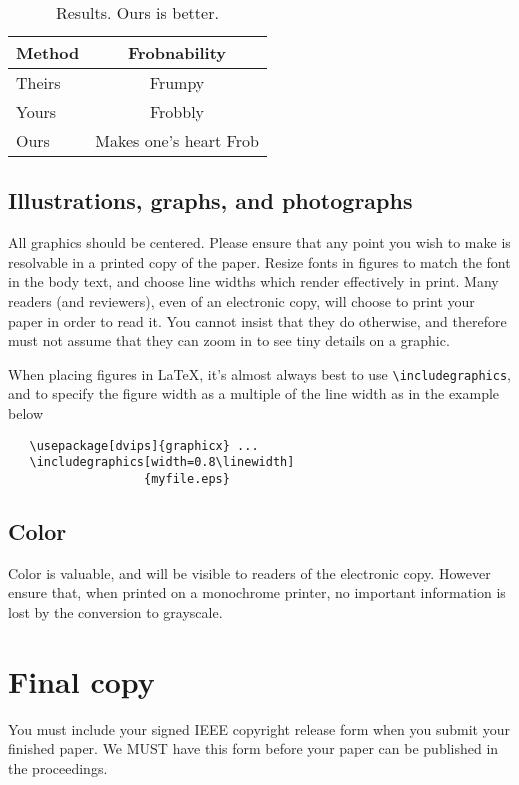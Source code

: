 \documentclass[10pt,twocolumn,letterpaper]{article}
\begin{document}
\begin{table}
\begin{center}
\begin{tabular}{|l|c|}
\hline
Method & Frobnability \\
\hline\hline
Theirs & Frumpy \\
Yours & Frobbly \\
Ours & Makes one's heart Frob\\
\hline
\end{tabular}
\end{center}
\caption{Results.   Ours is better.}
\end{table}

\subsection{Illustrations, graphs, and photographs}

All graphics should be centered.  Please ensure that any point you wish to
make is resolvable in a printed copy of the paper.  Resize fonts in figures
to match the font in the body text, and choose line widths which render
effectively in print.  Many readers (and reviewers), even of an electronic
copy, will choose to print your paper in order to read it.  You cannot
insist that they do otherwise, and therefore must not assume that they can
zoom in to see tiny details on a graphic.

When placing figures in \LaTeX, it's almost always best to use
\verb+\includegraphics+, and to specify the  figure width as a multiple of
the line width as in the example below
{\small\begin{verbatim}
   \usepackage[dvips]{graphicx} ...
   \includegraphics[width=0.8\linewidth]
                   {myfile.eps}
\end{verbatim}
}


\subsection{Color}

Color is valuable, and will be visible to readers of the electronic copy.
However ensure that, when printed on a monochrome printer, no important
information is lost by the conversion to grayscale.

\section{Final copy}

You must include your signed IEEE copyright release form when you submit
your finished paper. We MUST have this form before your paper can be
published in the proceedings.


{\small


}
\end{document}
